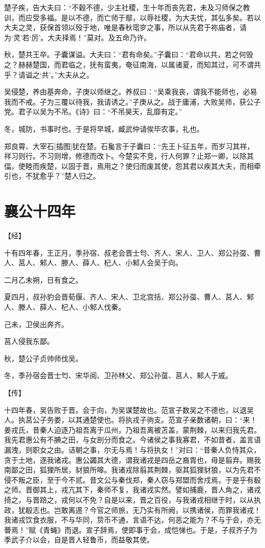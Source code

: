 \documentclass[a4paper,12pt,UTF8,twoside]{ctexbook}
\begin{document}
楚子疾，告大夫曰：“不穀不德，少主社稷，生十年而丧先君，未及习师保之教训，而应受多福。是以不德，而亡师于鄢，以辱社稷，为大夫忧，其弘多矣。若以大夫之灵，获保首领以殁于地，唯是春秋窀穸之事，所以从先君于祢庙者，请为‘灵’若‘厉’。大夫择焉！”莫对。及五命乃许。

秋，楚共王卒。子囊谋谥。大夫曰：“君有命矣。”子囊曰：“君命以共，若之何毁之？赫赫楚国，而君临之，抚有蛮夷，奄征南海，以属诸夏，而知其过，可不谓共乎？请谥之‘共’。”大夫从之。

吴侵楚，养由基奔命，子庚以师继之。养叔曰：“吴乘我丧，谓我不能师也，必易我而不戒。子为三覆以待我，我请诱之。”子庚从之。战于庸浦，大败吴师，获公子党。君子以吴为不吊。《诗》曰：“不吊昊天，乱靡有定。”

冬，城防，书事时也。于是将早城，臧武仲请俟毕农事，礼也。

郑良霄、大宰石[插图]犹在楚。石毚言于子囊曰：“先王卜征五年，而岁习其祥，祥习则行。不习则增，修德而改卜。今楚实不竞，行人何罪？止郑一卿，以除其偪，使睦而疾楚，以固于晋，焉用之？使归而废其使，怨其君以疾其大夫，而相牵引也，不犹愈乎？”楚人归之。

\chapter{襄公十四年}


【经】

十有四年春，王正月，季孙宿、叔老会晋士匄、齐人、宋人、卫人、郑公孙虿、曹人、莒人、邾人、滕人、薛人、杞人、小邾人会吴于向。

二月乙未朔，日有食之。

夏四月，叔孙豹会晋荀偃、齐人、宋人、卫北宫括、郑公孙虿、曹人、莒人、邾人、滕人、薛人、杞人、小邾人伐秦。

己未，卫侯出奔齐。

莒人侵我东鄙。

秋，楚公子贞帅师伐吴。

冬，季孙宿会晋士匄、宋华阅、卫孙林父、郑公孙虿、莒人、邾人于戚。

【传】

十四年春，吴告败于晋。会于向，为吴谋楚故也。范宣子数吴之不德也，以退吴人。执莒公子务娄，以其通楚使也。将执戎子驹支。范宣子亲数诸朝，曰：“来！姜戎氏，昔秦人迫逐乃祖吾离于瓜州，乃祖吾离被苫盖，蒙荆棘，以来归我先君。我先君惠公有不腆之田，与女剖分而食之。今诸侯之事我寡君，不如昔者，盖言语漏洩，则职女之由。诘朝之事，尔无与焉！与将执女！”对曰：“昔秦人负恃其众，贪于土地，逐我诸戎。惠公蠲其大德，谓我诸戎是四岳之裔胄也，毋是翦弃。赐我南鄙之田，狐狸所居，豺狼所嗥。我诸戎除翦其荆棘，驱其狐狸豺狼，以为先君不侵不叛之臣，至于今不贰。昔文公与秦伐郑，秦人窃与郑盟而舍戍焉，于是乎有殽之师。晋御其上，戎亢其下，秦师不复，我诸戎实然。譬如捕鹿，晋人角之，诸戎掎之，与晋踣之，戎何以不免？自是以来，晋之百役，与我诸戎相继于时，以从执政，犹殽志也。岂敢离逷？今官之师旅，无乃实有所阙，以携诸侯，而罪我诸戎！我诸戎饮食衣服，不与华同，贽币不通，言语不达，何恶之能为？不与于会，亦无瞢焉！”赋《青蝇》而退。宣子辞焉，使即事于会，成恺悌也。于是，子叔齐子为季武子介以会，自是晋人轻鲁币，而益敬其使。
\end{document}
